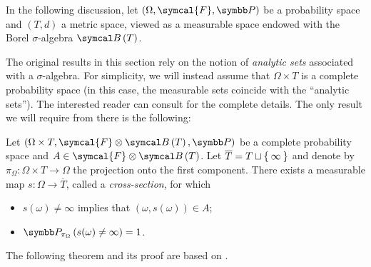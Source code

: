 In the following discussion, let \(\left(\Omega, \symcal{F}, \probability\right)\) be a probability space and \(\left(T, d\right)\) a metric space, viewed as a measurable space endowed with the Borel \(\sigma\)-algebra \(\borelsets{T}\).

The original results in this section rely on the notion of \emph{analytic sets} associated with a \(\sigma\)-algebra. For simplicity, we will instead assume that \(\Omega \times T\) is a complete probability space (in this case, the measurable sets coincide with the ``analytic sets''). The interested reader can consult \cite{DellacherieMeyer1978} for the complete details. The only result we will require from there is the following:

\begin{theorem}
\label{thm:measurable_cross_section}

Let \(\left(\Omega \times T, \symcal{F} \otimes \borelsets{T}, \probability\right)\) be a complete probability space and \(A \in \symcal{F} \otimes \borelsets{T}\). Let \(\overline{T} = T \sqcup \Set{ \infty }\) and denote by \(\pi_{\Omega} \colon \Omega \times T \to \Omega\) the projection onto the first component. There exists a measurable map \(s \colon \Omega \to \overline{T}\), called a \emph{cross-section}, for which
\begin{itemize}
    \item \(s(\omega) \neq \infty\) implies that \(\left(\omega, s(\omega)\right) \in A\);
    \item \(\probability_{\pi_{\Omega}}\left(s(\omega) \neq \infty\right) = 1\).
\end{itemize}
\end{theorem}

The following theorem and its proof are based on \cite[p.~197]{Pollard1984}.

